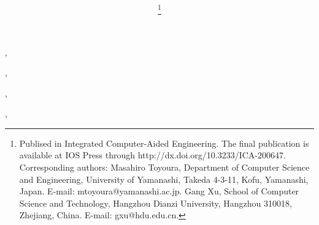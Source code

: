 
\begin{frontmatter} %
\title{    }

\author{ },  
\author{ \thanks{Publised in Integrated Computer-Aided Engineering. The final publication is available at IOS Press through http://dx.doi.org/10.3233/ICA-200647. Corresponding authors: Masahiro Toyoura,  Department of Computer Science and Engineering, University of Yamanashi, Takeda 4-3-11, Kofu, Yamanashi, Japan. E-mail: mtoyoura@yamanashi.ac.jp. Gang Xu, School of Computer Science and Technology, Hangzhou Dianzi University, Hangzhou 310018, Zhejiang, China. E-mail: gxu@hdu.edu.cn.}}, 
\author{ },  
\author{ },  
\author{ }
% 
\address{}
\address{}



\end{frontmatter}
